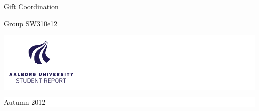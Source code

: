 %
%
%
%
	\thispagestyle{empty}

	\vspace*{\fill}

	\noindent \colorbox{aaublue}{
		\parbox{\textwidth}{%
			\color{white}%
			\begin{center}
				\Huge{{\selectfont Gift Coordination}} %
			\end{center}
			\begin{center}
			\Large{\textsf{Group SW310e12}} %
			\end{center}
		}}

	\vfill

	\noindent \colorbox{white}{
		\begin{minipage}[b]{6.5cm}
		\begin{center}
			\includegraphics[width=150px]{billeder/aau_new_logo}
			\end{center}
			\vspace*{-20px}
		\end{minipage}
	} 
	\hfill  
	\colorbox{white}{ 
		\begin{minipage}[b]{3.5cm}	 
			\flushright
			{\large Autumn 2012} \\
		\end{minipage}
	}

\clearpage
